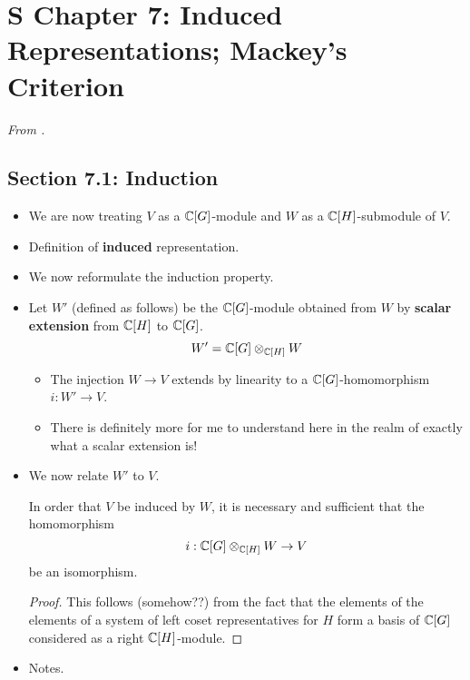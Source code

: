 \documentclass[../notes.tex]{subfiles}
\begin{document}
\section{S Chapter 7: Induced Representations; Mackey's Criterion}
\emph{From \textcite{bib:Serre}.}
\setcounter{proposition}{17}
\subsection*{Section 7.1: Induction}
\begin{itemize}
    \item {}We are now treating $V$ as a $\mathbb{C}[G]$-module and $W$ as a $\mathbb{C}[H]$-submodule of $V$.
    \item Definition of \textbf{induced} representation.
    \item We now reformulate the induction property.
    \item Let $W'$ (defined as follows) be the $\mathbb{C}[G]$-module obtained from $W$ by \textbf{scalar extension} from $\mathbb{C}[H]$ to $\mathbb{C}[G]$.
    \begin{equation*}
        W' = \mathbb{C}[G]\otimes_{\mathbb{C}[H]}W
    \end{equation*}
    \begin{itemize}
        \item The injection $W\to V$ extends by linearity to a $\mathbb{C}[G]$-homomorphism $i:W'\to V$.
        \item There is definitely more for me to understand here in the realm of exactly what a scalar extension is!
    \end{itemize}
    \item We now relate $W'$ to $V$.
    \begin{proposition}
        In order that $V$ be induced by $W$, it is necessary and sufficient that the homomorphism
        \begin{equation*}
            i:\mathbb{C}[G]\otimes_{\mathbb{C}[H]}W\to V
        \end{equation*}
        be an isomorphism.
        \begin{proof}
            This follows (somehow??) from the fact that the elements of the elements of a system of left coset representatives for $H$ form a basis of $\mathbb{C}[G]$ considered as a right $\mathbb{C}[H]$-module.
        \end{proof}
    \end{proposition}
    \item Notes.
    \begin{enumerate}

\end{enumerate}
\end{itemize}
\end{document}
